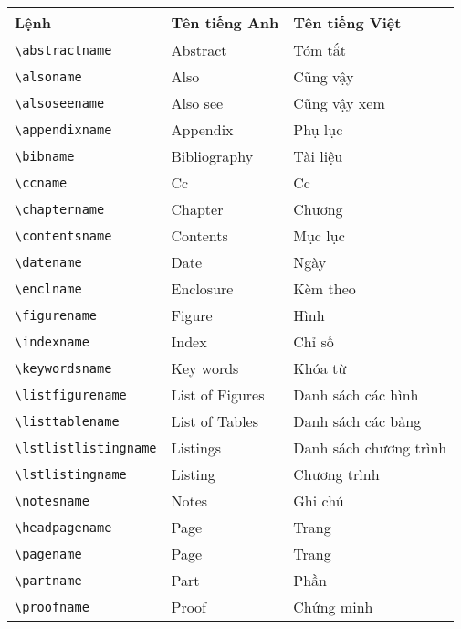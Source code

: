 \documentclass[12pt,a4paper]{article}
\renewcommand{\contentsname}{Nội dung}
\begin{document}
\begin{itemize}
\begin{itemize}
						\begin{table}[ht]
							\begin{center}
								\begin{tabular}{lll}
									\toprule
									\textbf{Lệnh}			& \textbf{Tên tiếng Anh}  & \textbf{Tên tiếng Việt}	\\ \midrule
									\verb|\abstractname| 		& Abstract		& Tóm tắt 		\\ \midrule
									\verb|\alsoname|		& Also 			& Cũng vậy 		\\ \midrule
									\verb|\alsoseename| 		& Also see		& Cũng vậy xem 		\\ \midrule
									\verb|\appendixname|		& Appendix		& Phụ lục 		\\ \midrule
									\verb|\bibname|			& Bibliography		& Tài liệu 		\\ \midrule
									\verb|\ccname|			& Cc			& Cc			\\ \midrule
									\verb|\chaptername|		& Chapter		& Chương		\\ \midrule
									\verb|\contentsname|		& Contents		& Mục lục 		\\ \midrule
									\verb|\datename|		& Date			& Ngày			\\ \midrule
									\verb|\enclname|		& Enclosure		& Kèm theo		\\ \midrule
									\verb|\figurename|		& Figure		& Hình			\\ \midrule
									\verb|\indexname|		& Index			& Chỉ số		\\ \midrule
									\verb|\keywordsname|		& Key words		& Khóa từ		\\ \midrule
									\verb|\listfigurename|		& List of Figures	& Danh sách các hình 	\\ \midrule
									\verb|\listtablename|		& List of Tables	& Danh sách các bảng 	\\ \midrule
									\verb|\lstlistlistingname|	& Listings		& Danh sách chương trình\\ \midrule
									\verb|\lstlistingname|		& Listing		& Chương trình		\\ \midrule
									\verb|\notesname|		& Notes			& Ghi chú		\\ \midrule
									\verb|\headpagename|		& Page			& Trang			\\ \midrule
									\verb|\pagename|		& Page			& Trang			\\ \midrule
									\verb|\partname|		& Part			& Phần			\\ \midrule
									\verb|\proofname|		& Proof			& Chứng minh		\\ \midrule

\end{tabular}
\end{center}
\end{table}
\end{itemize}
\end{itemize}
\end{document}
